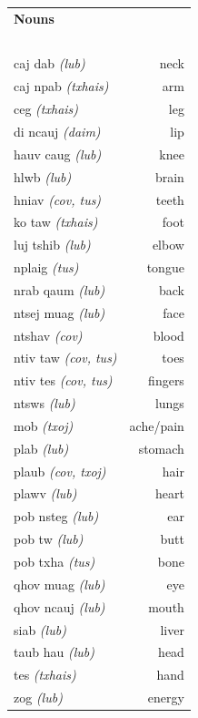 \documentclass{article}
\begin{document}
\clearpage

\begin{multicols}{2}
[
\section*{}
]

\begin{tabular}{l r}
\textbf{Nouns} \\
~\\
caj dab {\em (lub)} &neck\\
caj npab {\em (txhais)} &arm\\
ceg {\em (txhais)} &leg\\
di ncauj {\em (daim)} &lip\\
hauv caug {\em (lub)} &knee\\
hlwb {\em (lub)} &brain\\
hniav {\em (cov, tus)} &teeth\\
ko taw {\em (txhais)} &foot\\
luj tshib {\em (lub)} &elbow\\
nplaig {\em (tus)} &tongue\\
nrab qaum {\em (lub)} &back\\
ntsej muag {\em (lub)} &face\\
ntshav {\em (cov)} &blood\\
ntiv taw {\em (cov, tus)} &toes\\
ntiv tes {\em (cov, tus)} &fingers\\
ntsws {\em (lub)} &lungs\\
mob {\em (txoj)} &ache/pain\\
plab {\em (lub)} &stomach\\
plaub {\em (cov, txoj)} &hair\\
plawv {\em (lub)} &heart\\
pob nsteg {\em (lub)} &ear\\
pob tw {\em (lub)} &butt\\
pob txha {\em (tus)} &bone\\
qhov muag {\em (lub)} &eye\\
qhov ncauj {\em (lub)} &mouth\\
siab {\em (lub)} &liver\\
taub hau {\em (lub)} &head\\
tes {\em (txhais)} &hand\\
zog {\em (lub)} &energy\\

\end{tabular}


\end{multicols}
\end{document}
